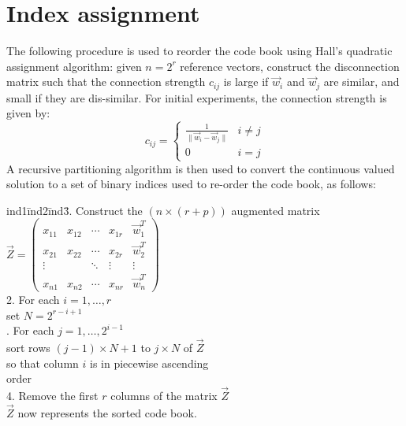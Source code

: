 \documentclass[a4paper]{report}
\begin{document}
\section{Index assignment}

The following procedure is used to reorder the code book using Hall's
quadratic assignment algorithm: given $n=2^r$ reference vectors, construct the
disconnection matrix such that the connection strength $c_{ij}$ is large
if $\vec{w}_i$ and $\vec{w}_j$ are similar, and small if they are
dis-similar.  For initial experiments, the connection strength is given by:
\begin{displaymath}
c_{ij} =
\left\{
\begin{array}{cl}
\frac{1}{\|\vec{w}_i - \vec{w}_j\|} & i \neq j\\
0 & i = j
\end{array}
\right.
\end{displaymath}
A recursive partitioning algorithm is then used to convert the continuous valued
solution to a set of binary indices used to re-order the code book, as follows:

\begin{tabbing}
ind1\= ind2\= ind3\= .  Construct the $(n\times (r+p))$ augmented matrix\\[10pt]
\> \begin{math}
\vec{Z} =
\left(
\begin{array}{ccccc}
x_{11} & x_{12} & \cdots & x_{1r} & \vec{w}_1^T\\
x_{21} & x_{22} & \cdots & x_{2r} & \vec{w}_2^T\\
\vdots & & \ddots & \vdots & \vdots\\
x_{n1} & x_{n2} & \cdots & x_{nr} & \vec{w}_n^T
\end{array}
\right)
\end{math}\\[10pt]
2. For each $i=1,\ldots, r$\\
\> set $N=2^{r-i+1}$\\
. For each $j=1, \ldots, 2^{i-1}$\\
\>\> sort rows $(j-1)\times N+1$ to $j\times N$ of $\vec{Z}$\\
\>\> so that column $i$ is in piecewise ascending\\
\>\> order\\
4. Remove the first $r$ columns of the matrix $\vec{Z}$\\[10pt]
$\vec{Z}$ now represents the sorted code book.
\end{tabbing}
\end{document}
